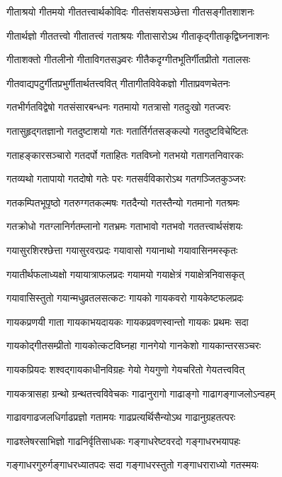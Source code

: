 \twolineshloka
{गीताश्रयो गीतमयो गीततत्त्वार्थकोविदः}%
{गीतसंशयसञ्छेत्ता गीतसङ्गीतशाशनः}%

\twolineshloka
{गीतार्थज्ञो गीततत्त्वो गीतातत्त्वं गताश्रयः}%
{गीतासारोऽथ गीताकृद्गीताकृद्विघ्ननाशनः}%

\twolineshloka
{गीताशक्तो गीतलीनो गीताविगतसञ्ज्वरः}%
{गीतैकदृग्गीतभूतिर्गीतप्रीतो गतालसः}%

\twolineshloka
{गीतवाद्यपटुर्गीतप्रभुर्गीतार्थतत्त्ववित्}%
{गीतागीतविवेकज्ञो गीताप्रवणचेतनः}%

\twolineshloka
{गतभीर्गतविद्वेषो गतसंसारबन्धनः}%
{गतमायो गतत्रासो गतदुःखो गतज्वरः}%

\twolineshloka
{गतासुहृद्गतज्ञानो गतदुष्टाशयो गतः}%
{गतार्तिर्गतसङ्कल्पो गतदुष्टविचेष्टितः}%

\twolineshloka
{गताहङ्कारसञ्चारो गतदर्पो गताहितः}%
{गतविघ्नो गतभयो गतागतनिवारकः}%

\twolineshloka
{गतव्यथो गतापायो गतदोषो गतेः परः}%
{गतसर्वविकारोऽथ गतगञ्जितकुञ्जरः}%

\twolineshloka
{गतकम्पितभूपृष्ठो गतरुग्गतकल्मषः}%
{गतदैन्यो गतस्तैन्यो गतमानो गतश्रमः}%

\twolineshloka
{गतक्रोधो गतग्लानिर्गतम्लानो गतभ्रमः}%
{गताभावो गतभवो गततत्त्वार्थसंशयः}%

\twolineshloka
{गयासुरशिरश्छेत्ता गयासुरवरप्रदः}%
{गयावासो गयानाथो गयावासिनमस्कृतः}%

\twolineshloka
{गयातीर्थफलाध्यक्षो गयायात्राफलप्रदः}%
{गयामयो गयाक्षेत्रं गयाक्षेत्रनिवासकृत्}%

\twolineshloka
{गयावासिस्तुतो गयान्मधुव्रतलसत्कटः}%
{गायको गायकवरो गायकेष्टफलप्रदः}%

\twolineshloka
{गायकप्रणयी गाता गायकाभयदायकः}%
{गायकप्रवणस्वान्तो गायकः प्रथमः सदा}%

\twolineshloka
{गायकोद्गीतसम्प्रीतो गायकोत्कटविघ्नहा}%
{गानगेयो गानकेशो गायकान्तरसञ्चरः}%

\twolineshloka
{गायकप्रियदः शश्वद्गायकाधीनविग्रहः}%
{गेयो गेयगुणो गेयचरितो गेयतत्त्ववित्}%

\twolineshloka
{गायकत्रासहा ग्रन्थो ग्रन्थतत्त्वविवेचकः}%
{गाढानुरागो गाढाङ्गो गाढागङ्गाजलोऽन्वहम्}%

\twolineshloka
{गाढावगाढजलधिर्गाढप्रज्ञो गतामयः}%
{गाढप्रत्यर्थिसैन्योऽथ गाढानुग्रहतत्परः}%

\twolineshloka
{गाढश्लेषरसाभिज्ञो गाढनिर्वृतिसाधकः}%
{गङ्गाधरेष्टवरदो गङ्गाधरभयापहः}%

\twolineshloka
{गङ्गाधरगुरुर्गङ्गाधरध्यातपदः सदा}
{गङ्गाधरस्तुतो गङ्गाधराराध्यो गतस्मयः}%

